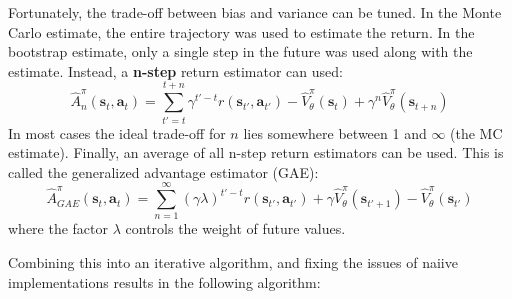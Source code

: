 Fortunately, the trade-off between bias and variance can be tuned.
In the Monte Carlo estimate, the entire trajectory was used
to estimate the return. In the bootstrap estimate,
only a single step in the future was used along with the estimate.
Instead, a \textbf{n-step} return estimator can used:
\begin{equation}
		\label{eq-n-step-return}
		\hat{A}^\pi_n (\bm{s}_{t}, \bm{a}_{t}) =
		\sum_{t'=t}^{t+n} \gamma^{t'-t} r(\bm{s}_{t'}, \bm{a}_{t'})
		- \hat{V}^\pi_\theta(\bm{s}_t) + \gamma^n \hat{V}^\pi_\theta(\bm{s}_{t+n})
\end{equation}
In most cases
the ideal trade-off for $ n  $ lies somewhere between 1 and $\infty$ (the MC estimate).
Finally, an average of all n-step return estimators can be used.
This is called the generalized advantage estimator (GAE):
\begin{equation}
\hat{A}^\pi_{GAE} (\bm{s}_{t}, \bm{a}_{t}) =
\sum_{n=1}^{\infty} (\gamma \lambda)^{t'-t}r(\bm{s}_{t'}, \bm{a}_{t'}) + \gamma \hat{V}^\pi_\theta(\bm{s}_{t'+1})  - \hat{V}^\pi_\theta(\bm{s}_{t'})
\end{equation}
where the factor $ \lambda  $ controls the weight of future values.

Combining this into an iterative algorithm, and fixing the issues
of naiive implementations results in the following algorithm:


